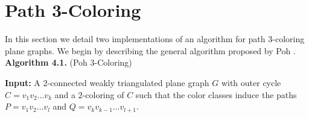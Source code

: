 \documentclass[letterpaper, 12pt]{amsart}
\theoremstyle{definition}
\theoremstyle{definition}
\theoremstyle{thm}
\theoremstyle{definition}
\begin{document}
\section{Path 3-Coloring}

\begin{comment}
\begin{proof}
If $|V(G)|\le 3$ there are no vertices to color. Let $|V(G)|>3$ and
suppose the theorem holds for all graphs $H$ with $|V(H)|<|V(G)|$. Let
$P=p_0\ldots p_n$ and $Q=q_0\ldots q_m$ denote the two induced paths from the
$2$-coloring of $C$, ordered such that the edges $p_0q_0$ and $p_nq_m$ are in
$C$. Suppose there exist uncolored vertices, that is $V(G)\setminus V(C)\ne
\emptyset$.

Let $t_0$ be the vertex forming a face with $p_0$ and $q_0$. If
$t_0\in P$, this face is already colored and we consider the graph bounded by
$P-p_0$ and $Q$. Similarly, if $t_0\in Q$ then the inductive hypothesis applies
to the graph bounded by $P$ and $Q-q_0$. Let $t_1$ be the vertex forming a face
with $p_n$ and $q_m$ and proceed in the same manner until $t_1$ is not in either
path.

Suppose there exists an induced path $T$ from $t_0$ to $t_1$. We color
$T$ the remaining color not assigned to $P$ or $Q$ and apply the inductive
hypothesis to the subgraph bounded by $P$ and $T$, and the subgraph bounded by
$T$ and $Q$. With only the path $T$ in common between the two subgraphs, the
combined $3$-coloring forms a path coloring of $G$.

Suppose no such path exists from $t_0$ to $t_1$. Since $G$ is weakly
triangulated there must exist an edge $p_iq_j\in E(G)\setminus E(C)$ with
$p_i\in P$ and $q_j\in Q$. We separately apply the inductive hypothesis to the
subgraph bounded by $p_0\ldots p_i$ and $q_0\ldots q_j$, and the subgraph
bounded by $p_i\ldots p_n$ and $q_j\ldots q_m$. The two subgraphs only share the
vertices $p_i$ and $q_j$, thus the combined $3$-coloring forms a path coloring
of $G$.
\end{proof}
\end{comment}

In this section we detail two implementations of an algorithm for path
$3$-coloring plane graphs. We begin by describing the general algorithm proposed
by Poh \cite{poh}.\\

\noindent\textbf{Algorithm 4.1.} (Poh $3$-Coloring)

\noindent\textbf{Input:} A $2$-connected weakly triangulated plane graph $G$
with outer cycle $C=v_1v_2\ldots v_k$ and a $2$-coloring of $C$ such that the
color classes induce the paths $P=v_1v_2\ldots v_l$ and
$Q=v_{k}v_{k-1}\ldots v_{l+1}$.
\end{document}
